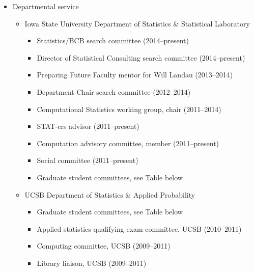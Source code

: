 \documentclass[overlapped,line]{res}
\begin{document}
\begin{resume}
\begin{itemize}
\item Departmental service
 	\begin{itemize}
	\item Iowa State University Department of Statistics \& Statistical Laboratory
		\begin{itemize}
		\item Statistics/BCB search committee (2014--present)
		\item Director of Statistical Consulting search committee (2014--present)
		\item Preparing Future Faculty mentor for Will Landau (2013--2014)
		\item Department Chair search committee (2012--2014)
		\item Computational Statistics working group, chair (2011--2014)
		\item STAT-ers advisor (2011--present)
		\item Computation advisory committee, member (2011--present)
		\item Social committee (2011--present)
		\item Graduate student committees, see Table below
		\end{itemize}
	\item UCSB Department of Statistics \& Applied Probability
		\begin{itemize}
		\item Graduate student committees, see Table below
		\item Applied statistics qualifying exam committee, UCSB (2010--2011)
		\item Computing committee, UCSB (2009--2011)
		\item Library liaison, UCSB (2009--2011)
		\end{itemize}
 	\end{itemize}
\end{itemize}


{\small
	    \begin{center}
		
		\end{center}
}



\end{resume}
\end{document}
